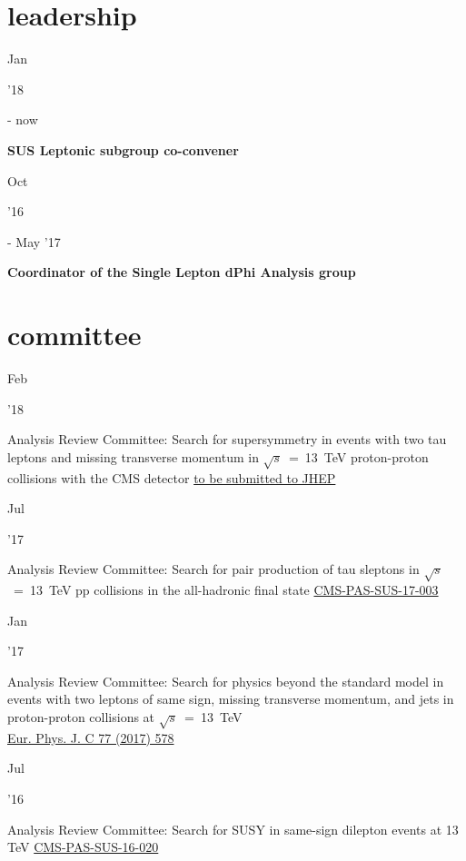 \documentclass[]{cv} %
\begin{document}
\section{leadership}

\begin{entrylist}

  \entry
  {\parbox[t]{\parboxWidthOne}{Jan}\parbox[t]{\parboxWidthTwo}{\hfill '18} - now}
  {\textbf{SUS Leptonic subgroup co-convener}}
  {}
  {}

  \entry
  {\parbox[t]{\parboxWidthOne}{Oct}\parbox[t]{\parboxWidthTwo}{\hfill '16} - May '17}
  {\textbf{Coordinator of the Single Lepton dPhi Analysis group}}
  {}
  {}

\end{entrylist}

\section{committee}

\begin{entrylist}

  \entry
  {\parbox[t]{\parboxWidthOne}{Feb}\parbox[t]{\parboxWidthTwo}{\hfill '18}}
  {Analysis Review Committee: Search for supersymmetry in events with two tau
  leptons and missing transverse momentum in $\sqrt{s}$~=~13~TeV proton-proton
  collisions with the CMS detector}
  {\href{}{to be submitted to JHEP}}
  {}

  \entry
  {\parbox[t]{\parboxWidthOne}{Jul}\parbox[t]{\parboxWidthTwo}{\hfill '17}}
  {Analysis Review Committee: Search for pair production of tau sleptons in
  $\sqrt{s}$~=~13~TeV pp collisions in the all-hadronic final state}
  {\href{https://cds.cern.ch/record/2273395}{CMS-PAS-SUS-17-003}}
  {}

\end{entrylist}
\begin{entrylist}

  \entry
  {\parbox[t]{\parboxWidthOne}{Jan}\parbox[t]{\parboxWidthTwo}{\hfill '17}}
  {Analysis Review Committee: Search for physics beyond the standard model in
  events with two leptons of same sign, missing transverse momentum, and jets in
  proton-proton collisions at $\sqrt{s}$~=~13~TeV\\}
  {\href{https://link.springer.com/article/10.1140\%2Fepjc\%2Fs10052-017-5079-z}{Eur. Phys. J. C 77 (2017) 578}}
  {}

  \entry
  {\parbox[t]{\parboxWidthOne}{Jul}\parbox[t]{\parboxWidthTwo}{\hfill '16}}
  {Analysis Review Committee: Search for SUSY in same-sign dilepton events at 13 TeV}
  {\href{https://cds.cern.ch/record/2204929}{CMS-PAS-SUS-16-020}}
  {}

\end{entrylist}
\end{document}
